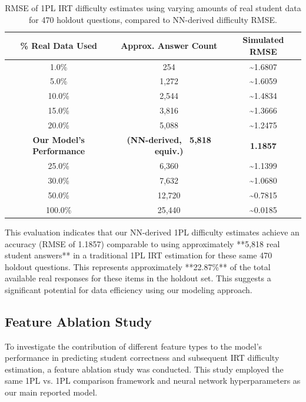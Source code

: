 \documentclass[
    a4paper, %
    10pt, %
    twoside, %
]{LTJournalArticle}
\begin{document}
\begin{table}[H]
    \centering
    \begin{tabular}{ccc}
        \hline
        \textbf{\% Real Data Used} & \textbf{Approx. Answer Count} & \textbf{Simulated RMSE} \\
        \hline
        1.0\% & 254 & \textasciitilde1.6807 \\
        5.0\% & 1,272 & \textasciitilde1.6059 \\
        10.0\% & 2,544 & \textasciitilde1.4834 \\
        15.0\% & 3,816 & \textasciitilde1.3666 \\
        20.0\% & 5,088 & \textasciitilde1.2475 \\
        \textbf{Our Model's Performance} & \textbf{(NN-derived, ~5,818 equiv.)} & \textbf{1.1857} \\
        25.0\% & 6,360 & \textasciitilde1.1399 \\
        30.0\% & 7,632 & \textasciitilde1.0680 \\
        50.0\% & 12,720 & \textasciitilde0.7815 \\
        100.0\% & 25,440 & \textasciitilde0.0185 \\
        \hline
    \end{tabular}
    \caption{RMSE of 1PL IRT difficulty estimates using varying amounts of real student data for 470 holdout questions, compared to NN-derived difficulty RMSE.}
    \label{tab:rmse-efficiency}
\end{table}

This evaluation indicates that our NN-derived 1PL difficulty estimates achieve an accuracy (RMSE of 1.1857) comparable to using approximately **5,818 real student answers** in a traditional 1PL IRT estimation for these same 470 holdout questions. This represents approximately **22.87\%** of the total available real responses for these items in the holdout set. This suggests a significant potential for data efficiency using our modeling approach.

\subsection{Feature Ablation Study}
To investigate the contribution of different feature types to the model's performance in predicting student correctness and subsequent IRT difficulty estimation, a feature ablation study was conducted. This study employed the same 1PL vs. 1PL comparison framework and neural network hyperparameters as our main reported model.
\end{document}
